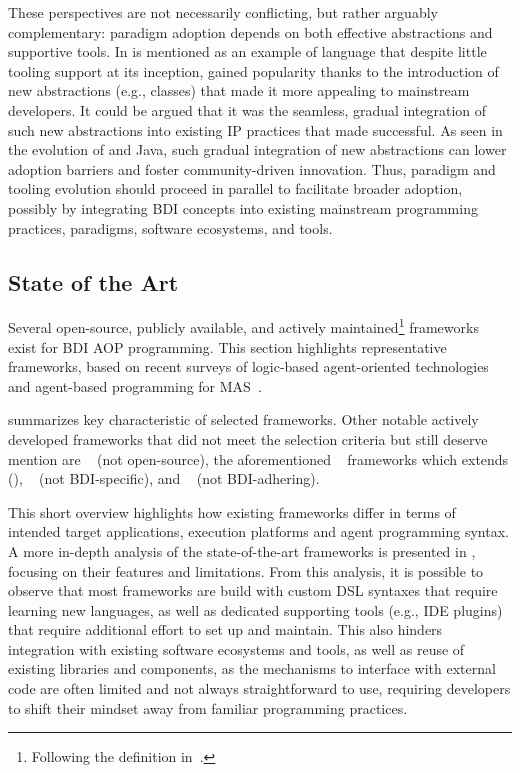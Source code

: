 These perspectives are not necessarily conflicting, but rather arguably complementary: paradigm adoption depends on both effective abstractions and supportive tools.
%
In \cite{DBLP:journals/ijaose/Logan18} \cpp is mentioned as an example of language that despite little tooling support at its inception, gained popularity thanks to the introduction of new abstractions (e.g., classes) that made it more appealing to mainstream developers.
%
It could be argued that it was the seamless, gradual integration of such new abstractions into existing \ac{IP} practices that made \cpp successful.
%
As seen in the evolution of \cpp and Java, such gradual integration of new abstractions can lower adoption barriers and foster community-driven innovation.
%
Thus, paradigm and tooling evolution should proceed in parallel to facilitate broader adoption, possibly by integrating \ac{BDI} concepts into existing mainstream programming practices, paradigms, software ecosystems, and tools.

\subsection{State of the Art}

Several open-source, publicly available, and actively maintained\footnote{Following the definition in~\cite{Cardoso_Ferrando_2021}.} frameworks exist for \ac{BDI} \ac{AOP} programming.
This section highlights representative frameworks, based on recent surveys of logic-based agent-oriented technologies~\cite{lptech4mas-jaamas35} and agent-based programming for \ac{MAS}~\cite{Cardoso_Ferrando_2021}.

 summarizes key characteristic of selected frameworks.
%
Other notable actively developed frameworks that did not meet the selection criteria but still deserve mention are
\jack{}~\cite{Winikoff2005} (not open-source),
the aforementioned \jacamo{}~\cite{Boissier_Bordini_Hübner_Ricci_Santi_2013} frameworks which extends \jason{} (),
\sarl{}~\cite{iat2014sarl} (not \ac{BDI}-specific),
and \goal{}~\cite{Hindriks2009} (not \ac{BDI}-adhering).

This short overview highlights how existing frameworks differ in terms of intended target applications, execution platforms and agent programming syntax.
%
A more in-depth analysis of the state-of-the-art frameworks is presented in \cite{DBLP:journals/sncs/BaiardiBCP24}, 
focusing on their features and limitations.
%
From this analysis, it is possible to observe that
most frameworks are build with custom \ac{DSL} syntaxes that require learning new languages, as well as dedicated supporting tools (e.g., IDE plugins) that require additional effort to set up and maintain.
%
This also hinders integration with existing software ecosystems and tools, as well as reuse of existing libraries and components, as the mechanisms to interface with external code are often limited and not always straightforward to use, requiring developers to shift their mindset away from familiar programming practices.

